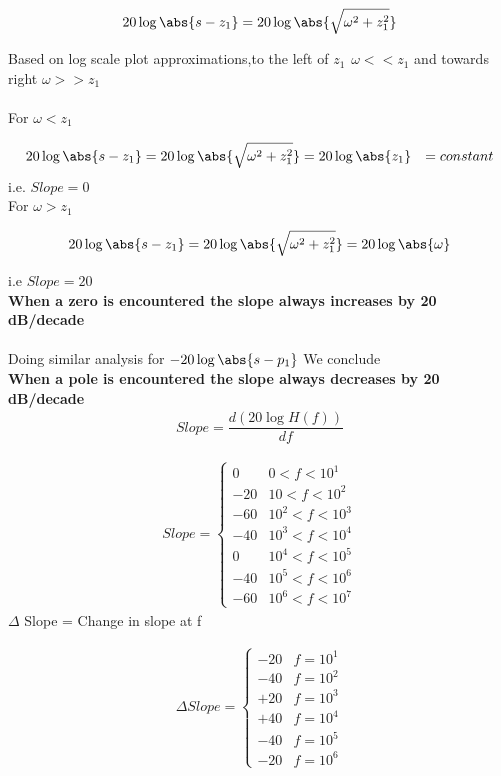 \begin{enumerate}[label=\thesection.\arabic*.,ref=\thesection.\theenumi]
\begin{align}
	20\log \abs{s-z_{1}} = 20\log \abs{\sqrt{\omega^{2} + z_{1}^{2}}} 
\end{align}

Based on log scale plot approximations,to the 
left of $z_{1} \hspace{5pt} \omega << z_{1} $ and towards right  $ \omega >> z_{1} $
\\ \\
For $\omega < z_{1}$

\begin{align}
	20\log \abs{s-z_{1}} = 20\log \abs{\sqrt{\omega^{2} + z_{1}^{2}}} 
	&= 20 \log \abs{z_{1}} 
	&= constant 
\end{align}  
i.e. $Slope = 0$
\\
For $\omega > z_{1}$

\begin{align}
	20\log \abs{s-z_{1}} = 20\log \abs{\sqrt{\omega^{2} + z_{1}^{2}}} = 20 \log \abs{\omega} 
\end{align}

i.e $Slope = 20 $
\\
\textbf{When a zero is encountered the slope always increases by 20 dB/decade}
\\
\\
Doing similar analysis for $ - 20\log \abs{s-p_{1}} $  We conclude
\\
\textbf{When a pole is encountered the slope always decreases by 20 dB/decade}
\\

\begin{align}
Slope = \dfrac{d(20\log H(f))}{df}
\end{align}

\begin{align}
 Slope = 
 \begin{cases} 
        0 & 0 < f < 10^{1} \\
      -20 & 10 < f < 10^{2} \\
      -60 & 10^{2} < f < 10^{3} \\
      -40 & 10^{3} < f < 10^{4} \\
       0 & 10^{4} < f < 10^{5} \\
      -40 & 10^{5} < f < 10^{6} \\
      -60 & 10^{6} < f < 10^{7}   
 \end{cases}
\end{align}
$ \Delta$ Slope = Change in slope at f

\begin{align}
 \Delta Slope = 
 \begin{cases} 
      -20 &  f = 10^{1} \\
      -40 &  f = 10^{2} \\
      +20 &  f = 10^{3} \\
      +40 &  f = 10^{4} \\
      -40 &  f = 10^{5} \\
      -20 &  f = 10^{6} 
 \end{cases}
\end{align}


\end{enumerate}
